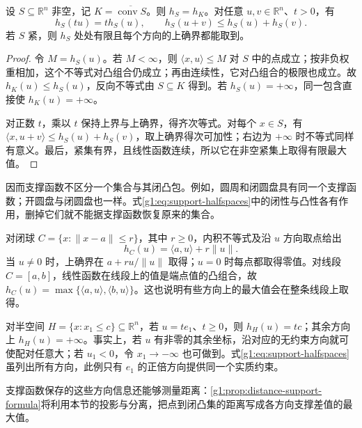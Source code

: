 \begin{proposition}\label{g1:prop:support-function-basic}
	设 \(S\subseteq\mathbb R^n\) 非空，记 \(K=\overline{\operatorname{conv}S}\)。则 \(h_S=h_K\)。对任意 \(u,v\in\mathbb R^n\)、\(t>0\)，有
	\[
		h_S(tu)=t h_S(u),\qquad h_S(u+v)\leq h_S(u)+h_S(v).
	\]
	若 \(S\) 紧，则 \(h_S\) 处处有限且每个方向的上确界都能取到。
\end{proposition}
\begin{proof}
	令 \(M=h_S(u)\)。若 \(M<\infty\)，则 \(\langle x,u\rangle\leq M\) 对 \(S\) 中的点成立；按非负权重相加，这个不等式对凸组合仍成立；再由连续性，它对凸组合的极限也成立。故 \(h_K(u)\leq h_S(u)\)，反向不等式由 \(S\subseteq K\) 得到。若 \(h_S(u)=+\infty\)，同一包含直接使 \(h_K(u)=+\infty\)。

	对正数 \(t\)，乘以 \(t\) 保持上界与上确界，得齐次等式。对每个 \(x\in S\)，有 \(\langle x,u+v\rangle\leq h_S(u)+h_S(v)\)，取上确界得次可加性；右边为 \(+\infty\) 时不等式同样有意义。最后，紧集有界，且线性函数连续，所以它在非空紧集上取得有限最大值。
\end{proof}

因而支撑函数不区分一个集合与其闭凸包。例如，圆周和闭圆盘具有同一个支撑函数；开圆盘与闭圆盘也一样。式\eqref{g1:eq:support-halfspaces}中的闭性与凸性各有作用，删掉它们就不能据支撑函数恢复原来的集合。

\begin{example}\label{g1:exm:support-functions}
	对闭球 \(C=\{x:\lVert x-a\rVert\leq r\}\)，其中 \(r\geq0\)，内积不等式及沿 \(u\) 方向取点给出
	\[
		h_C(u)=\langle a,u\rangle+r\lVert u\rVert.
	\]
	当 \(u\ne0\) 时，上确界在 \(a+ru/\lVert u\rVert\) 取得；\(u=0\) 时每点都取得零值。对线段 \(C=[a,b]\)，线性函数在线段上的值是端点值的凸组合，故 \(h_C(u)=\max\{\langle a,u\rangle,\langle b,u\rangle\}\)。这也说明有些方向上的最大值会在整条线段上取得。

	对半空间 \(H=\{x:x_1\leq c\}\subseteq\mathbb R^n\)，若 \(u=t e_1\)、\(t\geq0\)，则 \(h_H(u)=tc\)；其余方向上 \(h_H(u)=+\infty\)。事实上，若 \(u\) 有非零的其余坐标，沿对应的无约束方向就可使配对任意大；若 \(u_1<0\)，令 \(x_1\to-\infty\) 也可做到。式\eqref{g1:eq:support-halfspaces}虽列出所有方向，此例只有 \(e_1\) 的正倍方向提供同一个实质约束。
\end{example}

支撑函数保存的这些方向信息还能够测量距离：\cref{g1:prop:distance-support-formula}将利用本节的投影与分离，把点到闭凸集的距离写成各方向支撑差值的最大值。
